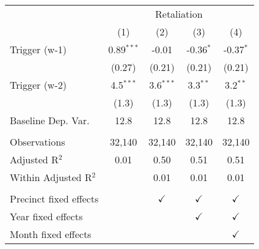 \begingroup \centering \begin{tabular}{lcccc}    \toprule     & \multicolumn{4}{c}{Retaliation}\\                           & (1)          & (2)           & (3)           & (4)\\      \midrule     Trigger (w-1)          & 0.89$^{***}$ & -0.01         & -0.36$^{*}$   & -0.37$^{*}$\\                              & (0.27)       & (0.21)        & (0.21)        & (0.21)\\       Trigger (w-2)          & 4.5$^{***}$  & 3.6$^{***}$   & 3.3$^{**}$    & 3.2$^{**}$\\                              & (1.3)        & (1.3)         & (1.3)         & (1.3)\\       Baseline Dep. Var.     & 12.8         & 12.8          & 12.8          & 12.8\\       \\    Observations           & 32,140       & 32,140        & 32,140        & 32,140\\      Adjusted R$^2$         & 0.01         & 0.50          & 0.51          & 0.51\\      Within Adjusted R$^2$  &              & 0.01          & 0.01          & 0.01\\       \\    Precinct fixed effects &              & $\checkmark$  & $\checkmark$  & $\checkmark$\\       Year fixed effects     &              &               & $\checkmark$  & $\checkmark$\\       Month fixed effects    &              &               &               & $\checkmark$\\       \bottomrule \end{tabular} \par\endgroup
